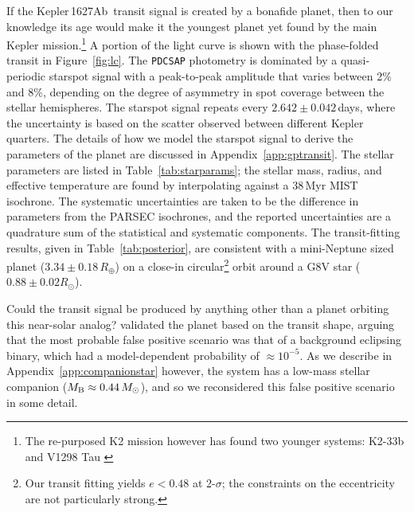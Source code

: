 \documentclass[12pt,modern,twocolumn,tighten]{aastex63}
\newcommand{\pn}{Kepler\,1627Ab} %
\begin{document}

If the \pn\ transit signal is created by a bonafide planet,  then to
our knowledge its age would make it the youngest planet yet found by
the main Kepler mission.\footnote{The re-purposed K2
mission however has found two younger systems: K2-33b and V1298 Tau
\citep{David_et_al_2017,Mann_K2_33b_2016,david_four_2019}}  A portion
of the light curve is shown with the phase-folded transit in
Figure~\ref{fig:lc}.  The \texttt{PDCSAP}
photometry is dominated by a quasi-periodic starspot signal with a peak-to-peak
amplitude that varies between 2\% and 8\%, depending on the degree of
asymmetry in spot coverage between the stellar hemispheres.  The
starspot signal repeats every $2.642\pm0.042$\,days, where the
uncertainty is based on the scatter observed between different Kepler
quarters.  The details of how we model the starspot signal to derive
the parameters of the planet are discussed in
Appendix~\ref{app:gptransit}.  The stellar parameters are listed in
Table~\ref{tab:starparams}; the stellar mass, radius, and effective
temperature are found by interpolating against a 38$\,$Myr MIST
isochrone.  The systematic uncertainties are taken to be the
difference in parameters from the PARSEC isochrones, and the reported
uncertainties are a quadrature sum of the statistical and systematic
components.  The transit-fitting results, given in
Table~\ref{tab:posterior}, are consistent with a mini-Neptune sized
planet ($3.34\pm 0.18\,R_\oplus$) on a close-in circular\footnote{Our
transit fitting yields $e<0.48$ at 2-$\sigma$; the constraints on the
eccentricity are not particularly strong.} orbit around a G8V star
($0.88 \pm 0.02 R_\odot$).

Could the transit signal be produced by anything other than a planet
orbiting this near-solar analog?  \citet{morton_false_2016} validated
the planet based on the transit shape, arguing that the most probable 
false positive scenario was that of a background eclipsing binary,
which had a model-dependent probability of $\approx10^{-5}$.
As we describe in Appendix~\ref{app:companionstar} however,
the system has a low-mass stellar companion ($M_{\rm B}\approx
0.44\,M_\odot$), and so we reconsidered this false positive scenario
in some detail. 

\end{document}

